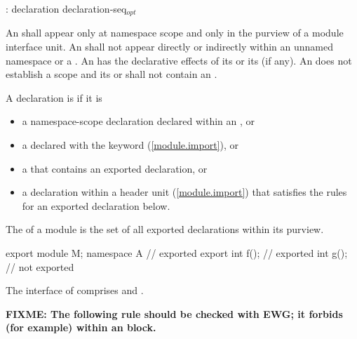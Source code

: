 \begin{std.txt}\color{addclr}
  \begin{bnf}\color{addclr}
    :\br
       declaration\br 
       \terminal{\{} declaration-seq${}_{opt}$ \terminal{\}} 
  \end{bnf}

  \pnum
  An  shall appear only
  at namespace scope and only in the purview of a module interface unit. 
  An  shall not appear directly
  or indirectly within an unnamed namespace
  or a .
  An 
  has the declarative effects of its 
  or its  (if any).
  An  does not
  establish a scope and its 
  or 
  shall not contain an .

  \pnum
  A declaration is  if it is
  \begin{itemize}\color{addclr}
  \item a namespace-scope declaration declared within an
        , or
  \item a  declared with
        the  keyword (\ref{module.import}), or
  \item a  that contains an
        exported declaration, or
  \item a declaration within a header unit (\ref{module.import})
        that satisfies the rules for an exported declaration below.
  \end{itemize}
  The  of a module  is the set of all
  exported declarations within its purview.
  \begin{example}
  \begin{codeblock}
  export module M;
  namespace A {         // exported
    export int f();     // exported
    int g();            // not exported
  }
  \end{codeblock}
  The interface of  comprises  and .
  \end{example}

\textbf{\color{red}FIXME: The following rule should be checked
with EWG; it forbids (for example)  within
an  block.}


\end{std.txt}
